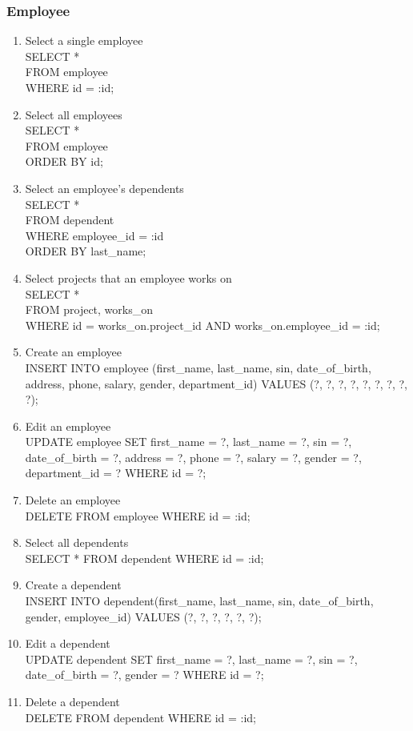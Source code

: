 \documentclass[fleqn, 11pt,letterpaper]{article}
\begin{document}
	\subsubsection{Employee}
	\begin{enumerate}
		\item Select a single employee \\SELECT * \\FROM employee \\WHERE id = :id;
		\item Select all employees \\SELECT * \\FROM employee \\ORDER BY id;
		\item Select an employee's dependents\\SELECT * \\FROM dependent \\WHERE employee\_id = :id \\ORDER BY last\_name;
		\item Select projects that an employee works on\\SELECT * \\FROM project, works\_on \\WHERE id = works\_on.project\_id AND works\_on.employee\_id = :id;
		\item Create an employee \\INSERT INTO employee (first\_name, last\_name, sin, date\_of\_birth, address, phone, salary, gender, department\_id) VALUES (?, ?, ?, ?, ?, ?, ?, ?, ?);
		\item Edit an employee \\UPDATE employee SET first\_name = ?, last\_name = ?, sin = ?, date\_of\_birth = ?, address = ?, phone = ?, salary = ?, gender = ?, department\_id = ? WHERE id = ?;
		\item Delete an employee\\DELETE FROM employee WHERE id = :id;
		\item Select all dependents \\SELECT * FROM dependent WHERE id = :id;
		\item Create a dependent \\INSERT INTO dependent(first\_name, last\_name, sin, date\_of\_birth, gender, employee\_id) VALUES (?, ?, ?, ?, ?, ?);
		\item Edit a dependent \\UPDATE dependent SET first\_name = ?, last\_name = ?, sin = ?, date\_of\_birth = ?, gender = ? WHERE id = ?;
		\item Delete a dependent \\DELETE FROM dependent WHERE id = :id;
	\end{enumerate}
\end{document}

